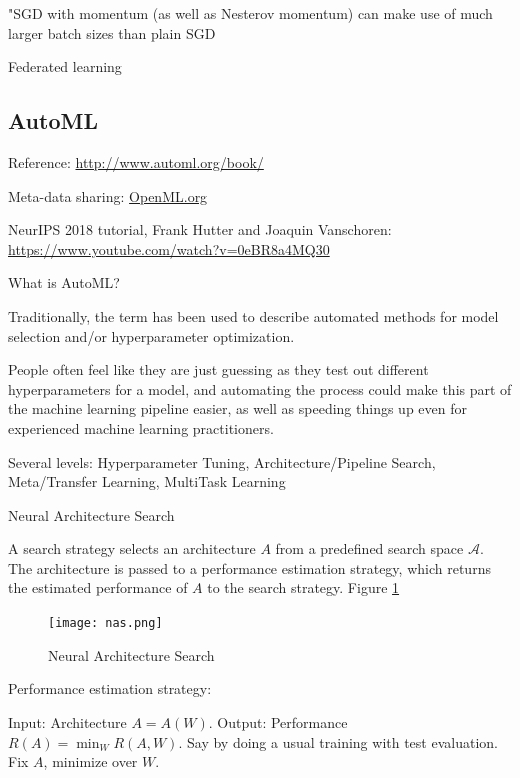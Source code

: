 \documentclass[english]{article}
\begin{document}
"SGD with momentum (as well as Nesterov momentum) can make use of much
larger batch sizes than plain SGD


\item Federated learning



\eenum 



\subsection{AutoML}


\benum 

\item Reference: \url{http://www.automl.org/book/}

Meta-data sharing: \url{OpenML.org}

NeurIPS 2018 tutorial, Frank Hutter and Joaquin Vanschoren: \url{https://www.youtube.com/watch?v=0eBR8a4MQ30}


\item What is AutoML?

Traditionally, the term has been used to describe automated methods for model selection and/or hyperparameter optimization.

People often feel like they are just guessing as they test out different hyperparameters for a model, and automating the process could make this part of the machine learning pipeline easier, as well as speeding things up even for experienced machine learning practitioners.

\item Several levels: Hyperparameter Tuning, Architecture/Pipeline Search, Meta/Transfer Learning, MultiTask Learning

\item Neural Architecture Search

\benum 
\item A search strategy selects an architecture $A$ from a predefined search space $\mathcal{A}$. The architecture is passed to a performance estimation strategy, which returns the estimated performance of $A$ to the search strategy. Figure \ref{nas} 

\begin{figure}[h!]
  \centering
  \texttt{[image: nas.png]}
  \caption{Neural Architecture Search}
  \label{nas}
\end{figure}

Performance estimation strategy: 

Input: Architecture $A=A(W)$. Output: Performance $R(A)=\min_W R(A,W)$. Say by doing a usual training with test evaluation. Fix $A$, minimize over $W$.
\end{document}
